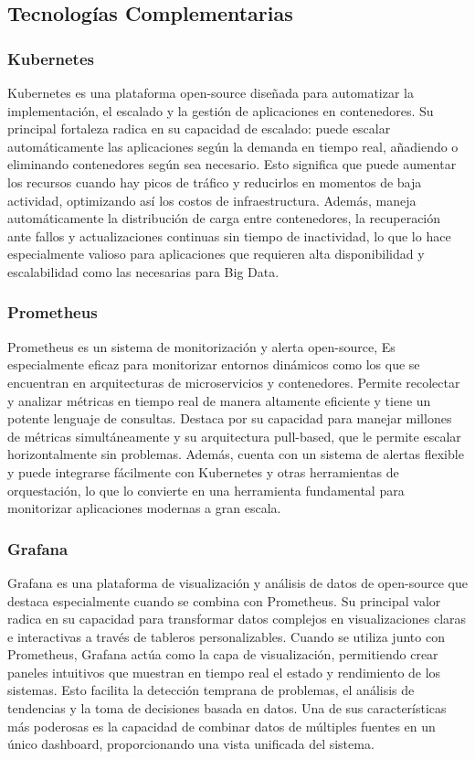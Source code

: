 \subsection{Tecnologías Complementarias}

\subsubsection{Kubernetes}

Kubernetes es una plataforma open-source diseñada para automatizar la implementación, el escalado y la gestión de aplicaciones en contenedores. 
Su principal fortaleza radica en su capacidad de escalado: puede escalar automáticamente las aplicaciones según la demanda en tiempo real, 
añadiendo o eliminando contenedores según sea necesario. 
Esto significa que puede aumentar los recursos cuando hay picos de tráfico y reducirlos en momentos de baja actividad, optimizando así los costos de infraestructura. 
Además, maneja automáticamente la distribución de carga entre contenedores, la recuperación ante fallos y actualizaciones continuas sin tiempo de inactividad, 
lo que lo hace especialmente valioso para aplicaciones que requieren alta disponibilidad y escalabilidad como las necesarias para Big Data.

\subsubsection{Prometheus}
Prometheus es un sistema de monitorización y alerta open-source, Es especialmente eficaz para monitorizar entornos dinámicos como los que se encuentran en arquitecturas de microservicios y contenedores.
Permite recolectar y analizar métricas en tiempo real de manera altamente eficiente y tiene un potente lenguaje de consultas. 
Destaca por su capacidad para manejar millones de métricas simultáneamente y su arquitectura pull-based, que le permite escalar horizontalmente sin problemas. 
Además, cuenta con un sistema de alertas flexible y puede integrarse fácilmente con Kubernetes y otras herramientas de orquestación, 
lo que lo convierte en una herramienta fundamental para monitorizar aplicaciones modernas a gran escala.

\subsubsection{Grafana}
Grafana es una plataforma de visualización y análisis de datos de open-source que destaca especialmente cuando se combina con Prometheus. 
Su principal valor radica en su capacidad para transformar datos complejos en visualizaciones claras e interactivas a través de tableros personalizables.
Cuando se utiliza junto con Prometheus, Grafana actúa como la capa de visualización, permitiendo crear paneles intuitivos que muestran en tiempo real el estado y rendimiento de los sistemas. 
Esto facilita la detección temprana de problemas, el análisis de tendencias y la toma de decisiones basada en datos. 
Una de sus características más poderosas es la capacidad de combinar datos de múltiples fuentes en un único dashboard, proporcionando una vista unificada del sistema. 

